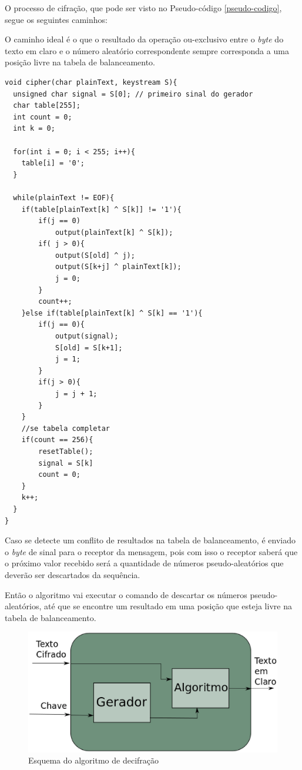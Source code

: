 O processo de cifração, que pode ser visto no Pseudo-código \ref{pseudo-codigo}, segue os seguintes caminhos:


O caminho ideal é o que o resultado da operação ou-exclusivo entre o \textit{byte} do texto em claro e o número aleatório correspondente sempre corresponda a uma posição livre na tabela de balanceamento.

\begin{lstlisting}[caption={Pseudo-Código Cifração}, label=pseudo-codigo]
void cipher(char plainText, keystream S){
  unsigned char signal = S[0]; // primeiro sinal do gerador
  char table[255];
  int count = 0;
  int k = 0;
  
  for(int i = 0; i < 255; i++){
  	table[i] = '0';
  }
  
  while(plainText != EOF){
	if(table[plainText[k] ^ S[k]] != '1'){
		if(j == 0)
			output(plainText[k] ^ S[k]);
		if( j > 0){
			output(S[old] ^ j);
			output(S[k+j] ^ plainText[k]);
			j = 0;
		}
		count++;
	}else if(table[plainText[k] ^ S[k] == '1'){
		if(j == 0){
			output(signal);
			S[old] = S[k+1];
			j = 1;		
		}
		if(j > 0){
			j = j + 1;
		}
	}
	//se tabela completar
	if(count == 256){
		resetTable();
		signal = S[k]
		count = 0;
	}
	k++;
  }
}
    \end{lstlisting}


Caso se detecte um conflito de resultados na tabela de balanceamento, é enviado o \textit{byte} de sinal para o receptor da mensagem, pois com isso o receptor saberá que o próximo valor recebido será a quantidade de números pseudo-aleatórios que deverão ser descartados da sequência. 

Então o algoritmo vai executar o comando de descartar os números pseudo-aleatórios, até que se encontre um resultado em uma posição que esteja livre na tabela de balanceamento. 


\begin{figure}[h]
	\centering
	\includegraphics[scale=0.4]{figuras/metodo_de_decifra.eps}
	\caption{Esquema do algoritmo de decifração}
\end{figure}

